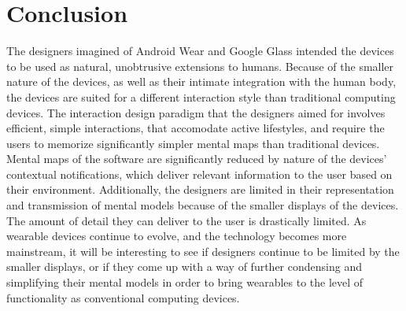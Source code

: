 \documentclass[12pt]{article}
\begin{document}
\section{Conclusion}
The designers imagined of Android Wear and Google Glass intended the devices to be used as natural, unobtrusive extensions to humans. Because of the smaller nature of the devices, as well as their intimate integration with the human body, the devices are suited for a different interaction style than traditional computing devices. The interaction design paradigm that the designers aimed for involves efficient, simple interactions, that accomodate active lifestyles, and require the users to memorize significantly simpler mental maps than traditional devices. Mental maps of the software are significantly reduced by nature of the devices' contextual notifications, which deliver relevant information to the user based on their environment. Additionally, the designers are limited in their representation and transmission of mental models because of the smaller displays of the devices. The amount of detail they can deliver to the user is drastically limited. As wearable devices continue to evolve, and the technology becomes more mainstream, it will be interesting to see if designers continue to be limited by the smaller displays, or if they come up with a way of further condensing and simplifying their mental models in order to bring wearables to the level of functionality as conventional computing devices.



\end{document}

